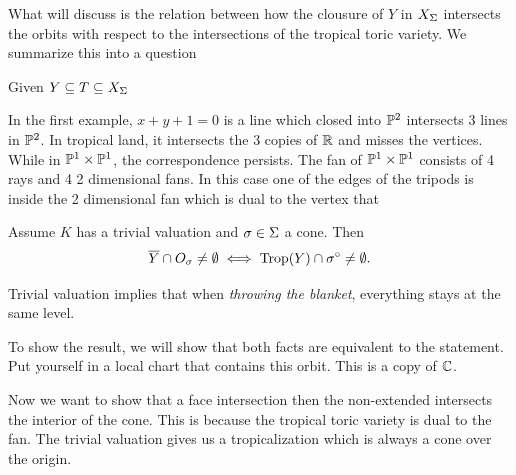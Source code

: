 \documentclass[12pt]{memoir}
\DeclareMathOperator{\Trop}{Trop}
\begin{document}
What will discuss is the relation between how the clousure of $Y$ in $X_\Sigma$ intersects the orbits with respect to the intersections of the tropical toric variety. We summarize this into a question 

\begin{significant}
    Given $Y\subseteq T\subseteq X_\Sigma$
\end{significant}

In the first example, $x+y+1=0$ is a line which closed into $\mathbb{P}^2$ intersects 3 lines in $\mathbb{P}^2$. In tropical land, it intersects the 3 copies of $\mathbb{R}$ and misses the vertices. While in $\mathbb{P}^1\times\mathbb{P}^1$, the correspondence persists. The fan of $\mathbb{P}^1\times\mathbb{P}^1$ consists of 4 rays and 4 2 dimensional fans. In this case one of the edges of the tripods is inside the 2 dimensional fan which is dual to the vertex that 

\begin{Th}
Assume $K$ has a trivial valuation and $\sigma\in\Sigma$ a cone. Then 
$$\ov Y\cap O_\sg\neq\emptyset\iff \Trop(Y)\cap\sg^\circ\neq\emptyset.$$
\end{Th}

\begin{Rmk}
Trivial valuation implies that when \emph{throwing the blanket}, everything stays at the same level.
\end{Rmk}

\begin{ptcbp}
To show the result, we will show that both facts are equivalent to the statement.  Put yourself in a local chart that contains this orbit. This is a copy of $\mathbb{C}$.\par 
Now we want to show that a face intersection then the non-extended intersects the interior of the cone. This is because the tropical toric variety is dual to the fan. The trivial valuation gives us a tropicalization which is always a cone over the origin. 
\end{ptcbp}
\end{document}
